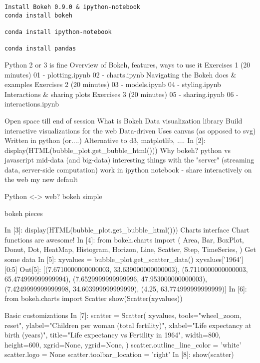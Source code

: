 \begin{framed}
	\begin{verbatim}
Install Bokeh 0.9.0 & ipython-notebook
conda install bokeh

conda install ipython-notebook

conda install pandas
\end{verbatim}


Python 2 or 3 is fine
Overview of Bokeh, features, ways to use it
Exercises 1 (20 minutes)
01 - plotting.ipynb
02 - charts.ipynb
Navigating the Bokeh docs & examples
Exercises 2 (20 minutes)
03 - models.ipynb
04 - styling.ipynb
 Interactions & sharing plots
 Exercises 3 (20 minutes)
05 - sharing.ipynb
06 - interactions.ipynb

Open space till end of session
What is Bokeh
Data visualization library
Build interactive visualizations for the web
Data-driven
Uses canvas (as opposed to svg)
Written in python (or....)
Alternative to d3, matplotlib, ....
In [2]:
display(HTML(bubble_plot.get_bubble_html()))
Why bokeh?
python vs javascript
mid-data (and big-data)
interesting things with the "server" (streaming data, server-side computation)
work in ipython notebook - share interactively on the web
my new default

Python <-> web?
bokeh simple

bokeh pieces

In [3]:
display(HTML(bubble_plot.get_bubble_html()))
Charts interface
Chart functions are awesome!
In [4]:
from bokeh.charts import (
Area, Bar, BoxPlot, Donut, Dot, HeatMap, Histogram,
Horizon, Line, Scatter, Step, TimeSeries, 
)
Get some data
In [5]:
xyvalues = bubble_plot.get_scatter_data()
xyvalues['1964'][0:5]
Out[5]:
[(7.6710000000000003, 33.639000000000003),
 (5.7110000000000003, 65.474999999999994),
 (7.6529999999999996, 47.953000000000003),
 (7.4249999999999998, 34.603999999999999),
 (4.25, 63.774999999999999)]
In [6]:
from bokeh.charts import Scatter
show(Scatter(xyvalues))
	
Basic customizations
In [7]:
scatter = Scatter(
    xyvalues, 
    tools="wheel_zoom, reset", 
    ylabel="Children per woman (total fertility)", 
    xlabel="Life expectancy at birth (years)",
    title="Life expectancy vs Fertility in 1964",
    width=800,
    height=600,
    xgrid=None,
    ygrid=None,
)
scatter.outline_line_color = 'white'
scatter.logo = None
scatter.toolbar_location = 'right'
In [8]:
show(scatter)



\end{framed}
